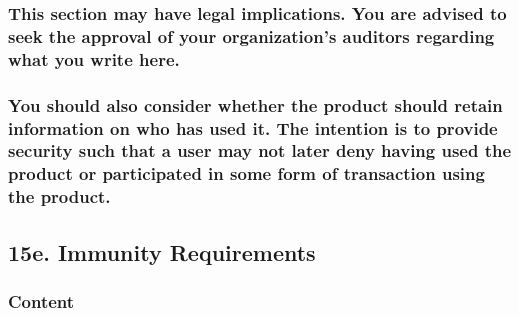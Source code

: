 \documentclass[
]{article}
\begin{document}
\hypertarget{this-section-may-have-legal-implications.-you-are-advised-to-seek-the-approval-of-your-organizations-auditors-regarding-what-you-write-here.}{%
\subsubsection{This section may have legal implications. You are advised
to seek the approval of your organization's auditors regarding what you
write
here.}\label{this-section-may-have-legal-implications.-you-are-advised-to-seek-the-approval-of-your-organizations-auditors-regarding-what-you-write-here.}}

\hypertarget{you-should-also-consider-whether-the-product-should-retain-information-on-who-has-used-it.-the-intention-is-to-provide-security-such-that-a-user-may-not-later-deny-having-used-the-product-or-participated-in-some-form-of-transaction-using-the-product.}{%
\subsubsection{\texorpdfstring{You should also consider whether the
product should retain information on who has used it. The intention is
to provide security such that a user may not later deny having used the
product or participated in some form of transaction using the product.
}{You should also consider whether the product should retain information on who has used it. The intention is to provide security such that a user may not later deny having used the product or participated in some form of transaction using the product. }}\label{you-should-also-consider-whether-the-product-should-retain-information-on-who-has-used-it.-the-intention-is-to-provide-security-such-that-a-user-may-not-later-deny-having-used-the-product-or-participated-in-some-form-of-transaction-using-the-product.}}

\hypertarget{e.-immunity-requirements}{%
\subsection{15e. Immunity Requirements}\label{e.-immunity-requirements}}

\hypertarget{content-56}{%
\subsubsection{Content}\label{content-56}}
\end{document}
